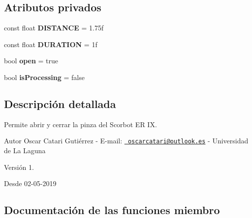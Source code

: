 \subsection*{Atributos privados}
\begin{DoxyCompactItemize}
\item 
\mbox{\label{class_grip_scorbot_e_r_i_x_aa6f69efb5ebf0ec0d514d0bfae01faf9}} 
const float {\bfseries D\+I\+S\+T\+A\+N\+CE} = 1.\+75f
\item 
\mbox{\label{class_grip_scorbot_e_r_i_x_ac0ce8dfa39136e1dde4bd2b367d00697}} 
const float {\bfseries D\+U\+R\+A\+T\+I\+ON} = 1f
\item 
\mbox{\label{class_grip_scorbot_e_r_i_x_aa22acdc647fbaf00c6ae208b79d8a856}} 
bool {\bfseries open} = true
\item 
\mbox{\label{class_grip_scorbot_e_r_i_x_a560c01d104571a7a9246ffba7f09e4ed}} 
bool {\bfseries is\+Processing} = false
\end{DoxyCompactItemize}


\subsection{Descripción detallada}
Permite abrir y cerrar la pinza del Scorbot ER IX. \begin{DoxyAuthor}{Autor}
Oscar Catari Gutiérrez -\/ E-\/mail\+: \href{mailto:oscarcatari@outlook.es}{\texttt{ oscarcatari@outlook.\+es}} -\/ Universidad de La Laguna 
\end{DoxyAuthor}
\begin{DoxyVersion}{Versión}
1. 
\end{DoxyVersion}
\begin{DoxySince}{Desde}
02-\/05-\/2019 
\end{DoxySince}


\subsection{Documentación de las funciones miembro}
\mbox{\label{class_grip_scorbot_e_r_i_x_a05f7c7720d01ab46bd5cd499b5f83646}} 
